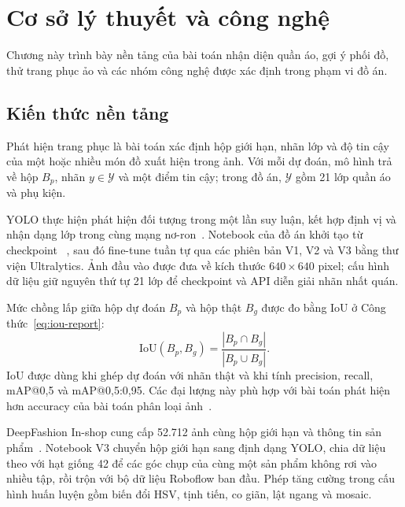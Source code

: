 \chapter{Cơ sở lý thuyết và công nghệ}
\label{ch:coso}

\begin{muctieu}
Chương này trình bày nền tảng của bài toán nhận diện quần áo, gợi ý phối đồ,
thử trang phục ảo và các nhóm công nghệ được xác định trong phạm vi đồ án.
\end{muctieu}

\section{Kiến thức nền tảng}

\begin{dinhnghia}
Phát hiện trang phục là bài toán xác định hộp giới hạn, nhãn lớp và độ tin
cậy của một hoặc nhiều món đồ xuất hiện trong ảnh. Với mỗi dự đoán, mô hình
trả về hộp $B_p$, nhãn $y \in \mathcal{Y}$ và một điểm tin cậy; trong đồ án,
$\mathcal{Y}$ gồm 21 lớp quần áo và phụ kiện.
\end{dinhnghia}

YOLO thực hiện phát hiện đối tượng trong một lần suy luận, kết hợp định vị và
nhận dạng lớp trong cùng mạng nơ-ron~\cite{Redmon2016}. Notebook của đồ án
khởi tạo từ checkpoint ~\cite{UltralyticsYOLO26}, sau đó fine-tune tuần tự qua các
phiên bản V1, V2 và V3 bằng thư viện Ultralytics. Ảnh đầu vào được đưa về
kích thước $640\times640$ pixel; cấu hình dữ liệu giữ nguyên thứ tự 21 lớp để
checkpoint và API diễn giải nhãn nhất quán.

Mức chồng lấp giữa hộp dự đoán $B_p$ và hộp thật $B_g$ được đo bằng IoU ở
Công thức~\eqref{eq:iou-report}:
\begin{equation}
\mathrm{IoU}(B_p,B_g)=\frac{|B_p\cap B_g|}{|B_p\cup B_g|}.
\label{eq:iou-report}
\end{equation}
IoU được dùng khi ghép dự đoán với nhãn thật và khi tính precision, recall,
mAP@0,5 và mAP@0,5:0,95. Các đại lượng này phù hợp với bài toán phát hiện hơn
accuracy của bài toán phân loại ảnh~\cite{COCO2014}.

DeepFashion In-shop cung cấp 52.712 ảnh cùng hộp giới hạn và thông tin sản
phẩm~\cite{DeepFashion2016}. Notebook V3 chuyển hộp giới hạn sang định dạng
YOLO, chia dữ liệu theo  với hạt giống 42 để các góc chụp của
cùng một sản phẩm không rơi vào nhiều tập, rồi trộn với bộ dữ liệu Roboflow
ban đầu. Phép tăng cường trong cấu hình huấn luyện gồm biến đổi HSV, tịnh tiến,
co giãn, lật ngang và mosaic.

